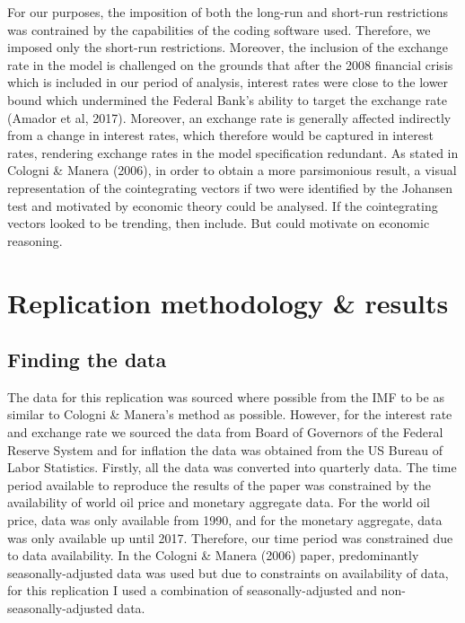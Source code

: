 \documentclass[11pt,preprint, authoryear]{elsarticle}
\numberwithin{equation}{section}
\numberwithin{figure}{section}
\numberwithin{table}{section}
\begin{document}
For our purposes, the imposition of both the long-run and short-run
restrictions was contrained by the capabilities of the coding software
used. Therefore, we imposed only the short-run restrictions. Moreover,
the inclusion of the exchange rate in the model is challenged on the
grounds that after the 2008 financial crisis which is included in our
period of analysis, interest rates were close to the lower bound which
undermined the Federal Bank's ability to target the exchange rate
(Amador et al, 2017). Moreover, an exchange rate is generally affected
indirectly from a change in interest rates, which therefore would be
captured in interest rates, rendering exchange rates in the model
specification redundant. As stated in Cologni \& Manera (2006), in order
to obtain a more parsimonious result, a visual representation of the
cointegrating vectors if two were identified by the Johansen test and
motivated by economic theory could be analysed. If the cointegrating
vectors looked to be trending, then include. But could motivate on
economic reasoning.

\hypertarget{replication-methodology-results}{%
\section{Replication methodology \&
results}\label{replication-methodology-results}}

\hypertarget{finding-the-data}{%
\subsection{Finding the data}\label{finding-the-data}}

The data for this replication was sourced where possible from the IMF to
be as similar to Cologni \& Manera's method as possible. However, for
the interest rate and exchange rate we sourced the data from Board of
Governors of the Federal Reserve System and for inflation the data was
obtained from the US Bureau of Labor Statistics. Firstly, all the data
was converted into quarterly data. The time period available to
reproduce the results of the paper was constrained by the availability
of world oil price and monetary aggregate data. For the world oil price,
data was only available from 1990, and for the monetary aggregate, data
was only available up until 2017. Therefore, our time period was
constrained due to data availability. In the Cologni \& Manera (2006)
paper, predominantly seasonally-adjusted data was used but due to
constraints on availability of data, for this replication I used a
combination of seasonally-adjusted and non-seasonally-adjusted data.
\end{document}
